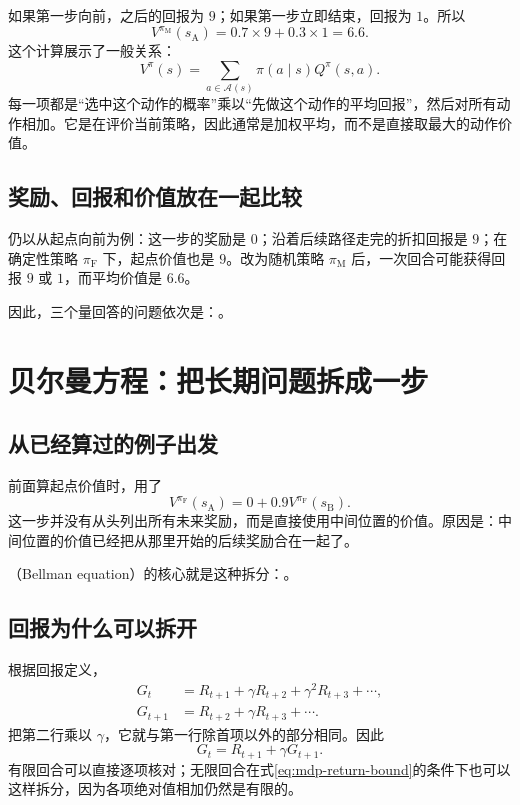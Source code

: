 \documentclass[UTF8]{ctexart}
\begin{document}
如果第一步向前，之后的回报为 $9$；如果第一步立即结束，回报为 $1$。所以
\[
  V^{\pi_{\mathrm M}}(s_{\mathrm A})=0.7\times9+0.3\times1=6.6.
\]
这个计算展示了一般关系：
\begin{equation}
  V^\pi(s)=\sum_{a\in\mathcal A(s)}\pi(a\mid s)Q^\pi(s,a).
  \label{eq:mdp-vq}
\end{equation}
每一项都是“选中这个动作的概率”乘以“先做这个动作的平均回报”，然后对所有动作相加。它是在评价当前策略，因此通常是加权平均，而不是直接取最大的动作价值。

\subsection{奖励、回报和价值放在一起比较}

仍以从起点向前为例：这一步的奖励是 $0$；沿着后续路径走完的折扣回报是 $9$；在确定性策略 $\pi_{\mathrm F}$ 下，起点价值也是 $9$。改为随机策略 $\pi_{\mathrm M}$ 后，一次回合可能获得回报 $9$ 或 $1$，而平均价值是 $6.6$。

因此，三个量回答的问题依次是：。

\section{贝尔曼方程：把长期问题拆成一步}
\label{sec:mdp-bellman}

\subsection{从已经算过的例子出发}

前面算起点价值时，用了
\[
  V^{\pi_{\mathrm F}}(s_{\mathrm A})
  =0+0.9V^{\pi_{\mathrm F}}(s_{\mathrm B}).
\]
这一步并没有从头列出所有未来奖励，而是直接使用中间位置的价值。原因是：中间位置的价值已经把从那里开始的后续奖励合在一起了。

（Bellman equation）的核心就是这种拆分：。

\subsection{回报为什么可以拆开}

根据回报定义，
\begin{align*}
  G_t&=R_{t+1}+\gamma R_{t+2}+\gamma^2R_{t+3}+\cdots,\\
  G_{t+1}&=R_{t+2}+\gamma R_{t+3}+\cdots.
\end{align*}
把第二行乘以 $\gamma$，它就与第一行除首项以外的部分相同。因此
\begin{equation}
  G_t=R_{t+1}+\gamma G_{t+1}.
  \label{eq:mdp-return-recursion}
\end{equation}
有限回合可以直接逐项核对；无限回合在式\eqref{eq:mdp-return-bound}的条件下也可以这样拆分，因为各项绝对值相加仍然是有限的。
\end{document}
